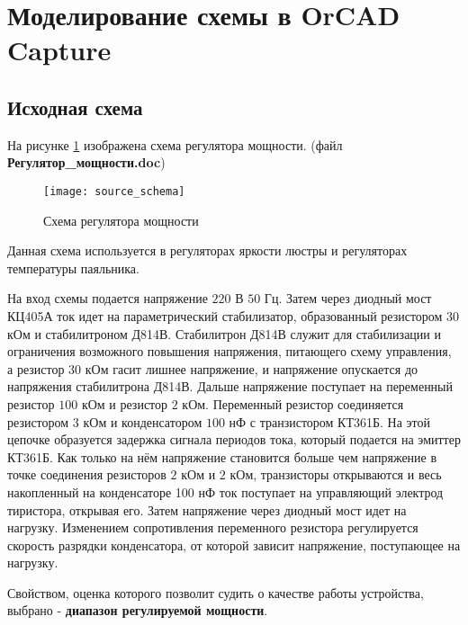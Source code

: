 





\newpage

\section{Моделирование схемы в OrCAD Capture}

\subsection{Исходная схема}

На рисунке \ref{pic:scheme} изображена схема регулятора мощности. (файл \textbf{Регулятор\_мощности.doc})

\begin{figure}[H]
\begin{center}
	\texttt{[image: source\_schema]}
	\caption{Схема регулятора мощности}
	\label{pic:scheme}
\end{center}
\end{figure}

Данная схема используется в регуляторах яркости люстры и регуляторах температуры паяльника.

На вход схемы подается напряжение $220$ В $50$ Гц. Затем через диодный мост КЦ405А ток идет на параметрический стабилизатор, образованный резистором $30$ кОм и стабилитроном Д814В. Стабилитрон Д814В служит для стабилизации и ограничения возможного повышения напряжения, питающего схему управления, а резистор $30$ кОм гасит лишнее напряжение, и напряжение опускается до напряжения стабилитрона Д814В. Дальше напряжение поступает на переменный резистор $100$ кОм и резистор $2$ кОм. Переменный резистор соединяется резистором $3$ кОм и конденсатором $100$ нФ с транзистором КТ361Б. На этой цепочке образуется задержка сигнала периодов тока, который подается на эмиттер КТ361Б. Как только на нём напряжение становится больше чем напряжение в точке соединения резисторов $2$ кОм и $2$ кОм, транзисторы открываются и весь накопленный на конденсаторе 100 нФ ток поступает на управляющий электрод тиристора, открывая его. Затем напряжение через диодный мост идет на нагрузку. Изменением сопротивления переменного резистора регулируется скорость разрядки конденсатора, от которой зависит напряжение, поступающее на нагрузку.

Свойством, оценка которого позволит судить о качестве работы устройства, выбрано - \textbf{диапазон регулируемой мощности}.

